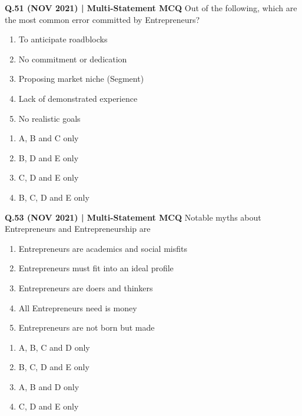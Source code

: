\documentclass{article}
\begin{document}
\textbf{Q.51 (NOV 2021) | Multi-Statement MCQ}
Out of the following, which are the most common error committed by Entrepreneurs?
\begin{enumerate}[label=\Alph*.]
    \item To anticipate roadblocks
    \item No commitment or dedication
    \item Proposing market niche (Segment)
    \item Lack of demonstrated experience
    \item No realistic goals
\end{enumerate}
\begin{enumerate}[label=(\arabic*)]
    \item A, B and C only
    \item B, D and E only
    \item C, D and E only
    \item B, C, D and E only
\end{enumerate}

\textbf{Q.53 (NOV 2021) | Multi-Statement MCQ}
Notable myths about Entrepreneurs and Entrepreneurship are
\begin{enumerate}[label=\Alph*.]
    \item Entrepreneurs are academics and social misfits
    \item Entrepreneurs must fit into an ideal profile
    \item Entrepreneurs are doers and thinkers
    \item All Entrepreneurs need is money
    \item Entrepreneurs are not born but made
\end{enumerate}
\begin{enumerate}[label=(\arabic*)]
    \item A, B, C and D only
    \item B, C, D and E only
    \item A, B and D only
    \item C, D and E only
\end{enumerate}
\end{document}
